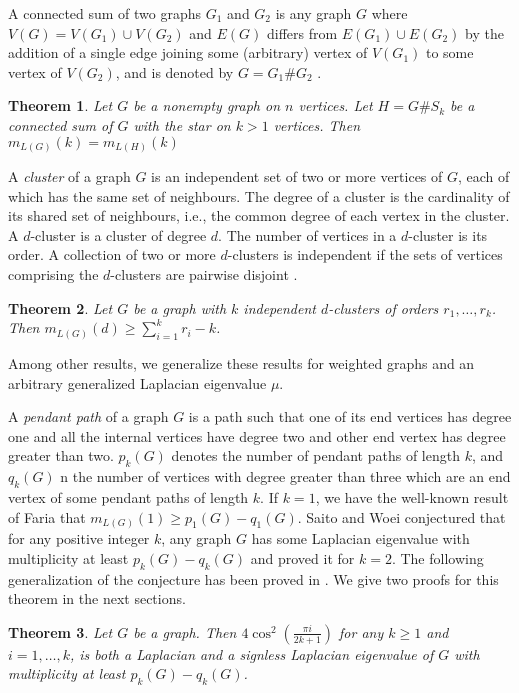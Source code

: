 \documentclass{amsart}
\newtheorem{theorem}{Theorem}
\theoremstyle{remark}
\begin{document}
A connected sum of two graphs $G_{1}$ and $G_{2}$ is any graph $G$ where $V(G)=V(G_{1})\cup V(G_{2})$ and $E(G)$
differs from $E(G_{1})\cup E(G_{2})$ by the addition of a single edge joining some (arbitrary) vertex of $V(G_{1})$
to some vertex of $V(G_{2})$, and is denoted by $G=G_{1}\#G_{2}$ \cite{GMS}.
\begin{theorem}{\rm \cite{GMS}}\label{delsn}
Let $G$ be a nonempty graph on $n$ vertices. Let $H = G\#S_{k}$ be a connected sum of $G$ with the star on $k>1$ vertices. Then $m_{L(G)}(k) =m_{L(H)}(k)$
\end{theorem}



A \textit{cluster} of a graph $G$ is an independent set of two or more vertices of $G$, each of which has the same set of neighbours. The degree of a cluster is the cardinality of its shared set of neighbours, i.e., the common degree of each vertex in the cluster. A $d$-cluster is a cluster of degree $d$. The number of vertices in a $d$-cluster is its order. A collection of two or more $d$-clusters is independent if the sets of vertices comprising the $d$-clusters are pairwise disjoint \cite{GM}.

\begin{theorem}{\rm \cite{GM}}\label{dcluster}
 Let $G$ be a graph with $k$ independent $d$-clusters of orders $r_{1},\ldots,r_{k}$. Then $m_{L(G)}(d)\geq \sum_{i=1}^{k} r_{i} -k$.
 \end{theorem}
 
 Among other results, we generalize these results for weighted graphs and an arbitrary generalized Laplacian eigenvalue $\mu$.

A \textit{pendant path} of a graph $G$ is a path such that one of its end vertices has degree one and all the internal vertices have degree two and other end vertex has degree greater than two.
$p_k(G)$ denotes the number of pendant paths of length $k$, and $q_k(G)$ n the number of vertices with degree greater than three which are an end vertex of some pendant paths of length $k$.
If $k=1$, we have the well-known result of Faria \cite{Fa} that $m_{L(G)}(1)\geq p_{1}(G) - q_{1}(G)$.
Saito and  Woei \cite{SW} conjectured that  for any positive integer $k$, any graph $G$ has some Laplacian eigenvalue with multiplicity at least $p_k(G)-q_k(G)$ and proved it for $k=2$. The following generalization of the conjecture has been proved in \cite{Gh}. We give two proofs for this theorem in the next sections.

\begin{theorem}{\rm \cite{Gh}}\label{pkqk}
Let $G$ be a graph. Then $\displaystyle 4\cos^{2}(\frac{\pi i}{2k + 1})$ for any $k\geq 1$ and $i =1,\ldots,k$, is
both a Laplacian and a signless Laplacian eigenvalue of $G$ with multiplicity at least $p_{k}(G) - q_{k}(G)$.
\end{theorem}
\end{document}
